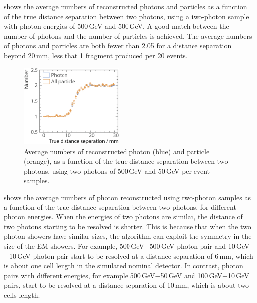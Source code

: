  shows  the average numbers of reconstructed photons and particles  as a function of the true distance separation between two photons, using a two-photon sample with photon energies of  500\,GeV and 500\,GeV. A good match between the number of photons and the number of particles is achieved. The average numbers of photons and particles are  both fewer than 2.05 for a distance separation beyond 20\,mm, less that 1 fragment produced per 20 events.



\begin{figure}[tbph]
\centering
        \includegraphics[width=0.45\textwidth]{photon/DoubleN_pN_all3}
        \caption{Average numbers of reconstructed photon  (blue) and particle (orange), as a function of the true distance separation between two photons, using two photons of 500\,GeV and 50\,GeV per event samples. }
        \label{fig:photonDoubleCompareN_pN_all}
\end{figure}


 shows the average numbers of photon reconstructed using two-photon samples as a function of the true distance separation between two photons, for different photon energies. When the energies of two photons are similar, the distance of two photons starting to be resolved is shorter. This is because that when the two photon showers have similar sizes, the \peakFinding algorithm can exploit the symmetry in the size of the EM showers. For example, 500\,GeV$-$500\,GeV photon pair and 10\,GeV$-$10\,GeV photon pair start to be resolved at a distance separation of 6\,mm, which is about one \ECAL cell length in the simulated nominal \ILD detector. In contrast, photon pairs with different energies, for example 500\,GeV$-$50\,GeV and  100\,GeV$-$10\,GeV pairs, start to be resolved at a distance separation of 10\,mm, which is about two \ECAL cells length.

